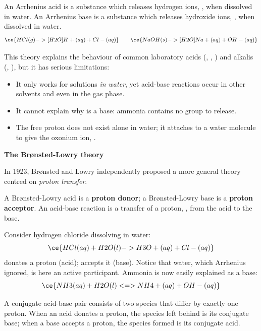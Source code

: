 \documentclass[11pt]{article}
\newcommand{\cle}[1]{{\popxbold\color{popdark}#1}}
\begin{document}
\begin{definition}
An \cle{Arrhenius acid} is a substance which releases hydrogen ions, , when dissolved in water. An \cle{Arrhenius base} is a substance which releases hydroxide ions, , when dissolved in water.
\[
\ce{HCl(g) ->[H2O] H+(aq) + Cl-(aq)} \qquad \ce{NaOH(s) ->[H2O] Na+(aq) + OH-(aq)}
\]
\end{definition}

This theory explains the behaviour of common laboratory acids (, , ) and alkalis (, ), but it has serious \cle{limitations}:
\begin{itemize}
\item It only works for solutions \emph{in water}, yet acid-base reactions occur in other solvents and even in the gas phase.
\item It cannot explain why  is a base: ammonia contains no  group to release.
\item The free proton  does not exist alone in water; it attaches to a water molecule to give the \cle{oxonium ion}, .
\end{itemize}

\textbf{The Brønsted-Lowry theory}\par
In 1923, Brønsted and Lowry independently proposed a more general theory centred on \emph{proton transfer}.

\begin{definition}
A \cle{Brønsted-Lowry acid} is a \textbf{proton donor}; a \cle{Brønsted-Lowry base} is a \textbf{proton acceptor}. An acid-base reaction is a transfer of a proton, , from the acid to the base.
\end{definition}

Consider hydrogen chloride dissolving in water:
\[
\ce{HCl(aq) + H2O(l) -> H3O+(aq) + Cl-(aq)}
\]
 donates a proton (acid);  accepts it (base). Notice that water, which Arrhenius ignored, is here an active participant. Ammonia is now easily explained as a base:
\[
\ce{NH3(aq) + H2O(l) <=> NH4+(aq) + OH-(aq)}
\]

\begin{definition}
A \cle{conjugate acid-base pair} consists of two species that differ by exactly one proton. When an acid donates a proton, the species left behind is its \cle{conjugate base}; when a base accepts a proton, the species formed is its \cle{conjugate acid}.
\end{definition}
\end{document}

